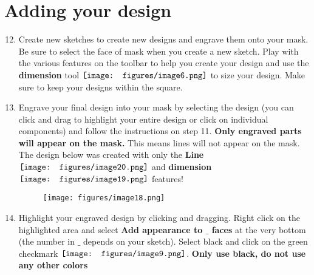 \documentclass[12pt]{../manual}
\begin{document}
\section{Adding your design}
\begin{enumerate}
\setcounter{enumi}{11}
\item Create new sketches to create new designs and engrave them onto your mask. Be sure to select the face of mask when you create a new sketch. Play with the various features on the toolbar to help you create your design and use the {\bf dimension} tool $\vcenter{\hbox{\texttt{[image: figures/image6.png]}}}$ to size your design. Make sure to keep your designs within the square.
\item Engrave your final design into your mask by selecting the design (you can click and drag to highlight your entire design or click on individual components) and follow the instructions on step 11. {\bf Only engraved parts will appear on the mask.} This means lines will not appear on the mask. The design below was created with only the {\bf Line} $\vcenter{\hbox{\texttt{[image: figures/image20.png]}}}$  and {\bf dimension} $\vcenter{\hbox{\texttt{[image: figures/image19.png]}}}$ features!
\begin{figure}[ht!]
\centering
\texttt{[image: figures/image18.png]}
\end{figure}
\item Highlight your engraved design by clicking and dragging. Right click on the highlighted area and select {\bf Add appearance to $\_$ faces} at the very bottom (the number in $\_$ depends on your sketch). Select black and click on the green checkmark $\vcenter{\hbox{\texttt{[image: figures/image9.png]}}}$. {\bf Only use black, do not use any other colors}
\end{enumerate}
\newpage
\end{document}
